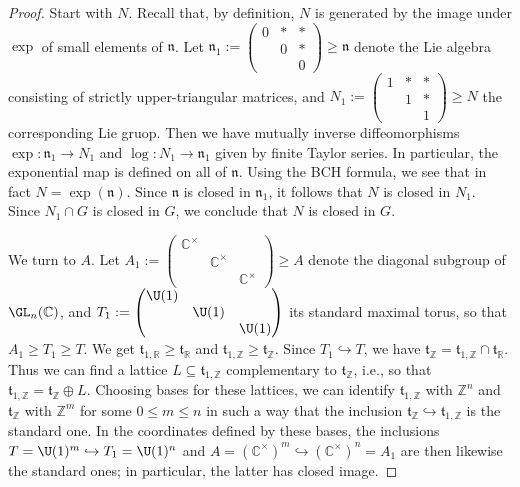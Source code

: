 \documentclass[reqno]{amsart} 
\begin{document}
\begin{proof}
  Start with $N$.  Recall that, by definition, $N$ is generated by the image under $\exp$ of small elements of $\mathfrak{n}$.  Let $\mathfrak{n}_1 := 
\begin{pmatrix}
    0 & \ast & \ast \\
    & 0 & \ast \\
    & & 0
  \end{pmatrix}
 \geq \mathfrak{n}$ denote the Lie algebra consisting of strictly upper-triangular matrices, and $N_1 := 
\begin{pmatrix}
    1 & \ast & \ast \\
    & 1 & \ast \\
    & & 1
  \end{pmatrix}
  \geq N$ the corresponding Lie gruop.
  Then we have mutually inverse diffeomorphisms $\exp : \mathfrak{n}_1 \rightarrow N_1$ and $\log : N_1 \rightarrow \mathfrak{n}_1$ given by finite Taylor series.  In particular, the exponential map is defined on all of $\mathfrak{n}$.  Using the BCH formula, we see that in fact $N = \exp(\mathfrak{n})$.  Since $\mathfrak{n}$ is closed in $\mathfrak{n}_1$, it follows that $N$ is closed in $N_1$.  Since $N_1 \cap G$ is closed in $G$, we conclude that $N$ is closed in $G$.

  We turn to $A$.  Let $A_1 := 
  \begin{pmatrix}
    \mathbb{C}^\times  &  &  \\
    & \mathbb{C}^\times  &  \\
    & & \mathbb{C}^\times
  \end{pmatrix}
  \geq A$ denote the diagonal subgroup of $\GL_n(\mathbb{C})$, and $T_1 := 
\begin{pmatrix}
    \U(1) &  &  \\
    & \U(1) &  \\
    & & \U(1)
  \end{pmatrix}
  $ its standard maximal torus, so that $A_1 \geq T_1 \geq T$.  We get $\mathfrak{t}_{1,\mathbb{R}} \geq \mathfrak{t}_{\mathbb{R}}$ and $\mathfrak{t}_{1,\mathbb{Z}} \geq \mathfrak{t}_{\mathbb{Z}}$.  Since $T_1 \hookrightarrow T$, we have $\mathfrak{t}_{\mathbb{Z}} = \mathfrak{t}_{1,\mathbb{Z}} \cap \mathfrak{t}_{\mathbb{R}}$.  Thus we can find a lattice $L \subseteq \mathfrak{t}_{1,\mathbb{Z}}$ complementary to $\mathfrak{t}_{\mathbb{Z}}$, i.e., so that $\mathfrak{t}_{1,\mathbb{Z}} = \mathfrak{t}_{\mathbb{Z}} \oplus L$.  Choosing bases for these lattices, we can identify $\mathfrak{t}_{1,\mathbb{Z}}$ with $\mathbb{Z}^n$ and $\mathfrak{t}_{\mathbb{Z}}$ with $\mathbb{Z}^m$ for some $0 \leq m \leq n$ in such a way that the inclusion $\mathfrak{t}_{\mathbb{Z}} \hookrightarrow \mathfrak{t}_{1,\mathbb{Z}}$ is the standard one.  In the coordinates defined by these bases, the inclusions $T = \U(1)^m \hookrightarrow T_1 = \U(1)^n$ and $A = (\mathbb{C}^\times)^m \hookrightarrow (\mathbb{C}^\times)^n = A_1$ are then likewise the standard ones; in particular, the latter has closed image.
\end{proof}
\end{document}
